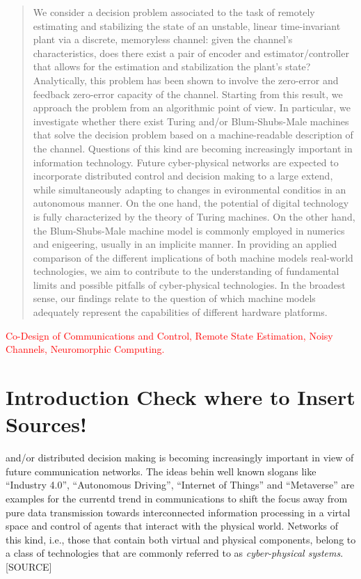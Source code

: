 \documentclass[conference]{IEEEtran}
\newcommand{\sdummy}{{\color{red}[SOURCE]}}
\begin{document}
\begin{abstract}
	We consider a decision problem associated to the task of remotely estimating and stabilizing the state of an unstable, 
	linear time-invariant plant via a discrete, memoryless channel: given the channel's characteristics, does there exist a pair 
	of encoder and estimator/controller that allows for the estimation and stabilization the plant's state? 
	Analytically, this problem has been shown to involve the zero-error and feedback zero-error capacity of the channel. 
	Starting from this result, we approach the problem from an algorithmic point of view. 
	In particular, we investigate whether there exist Turing and/or Blum-Shubs-Male machines that solve the decision problem
	based on a machine-readable description of the channel. Questions of this kind are becoming increasingly important in information technology.
	Future cyber-physical networks are expected to incorporate distributed control and decision making to a large extend,
	while simultaneously adapting to changes in evironmental conditios in an autonomous manner. 
	On the one hand, the potential of digital technology is fully characterized by the theory of Turing machines.
	On the other hand, the Blum-Shubs-Male machine model is commonly employed in numerics and enigeering, usually in an implicite manner. 
	In providing an applied comparison of the different implications of both machine models real-world technologies,
	we aim to contribute to the understanding of fundamental limits and possible pitfalls of cyber-physical technologies.
	In the broadest sense, our findings relate to the question of which machine models adequately represent the capabilities of 
	different hardware platforms. 
\end{abstract}

\begin{IEEEkeywords}
	\textcolor{red}{Co-Design of Communications and Control, Remote State Estimation, Noisy Channels, Neuromorphic Computing.} 
\end{IEEEkeywords}

\section{Introduction {\color{red}\textbf{Check where to Insert Sources!}}}	\label{sec:Introduction}
	 and/or distributed decision making is becoming increasingly important in view of future communication networks. The ideas behin well known slogans like 
	``Industry 4.0'', ``Autonomous Driving'', ``Internet of Things'' and ``Metaverse'' are examples for the currentd trend in communications to shift the focus away from pure data transmission 
	towards interconnected information processing in a virtal space and control of agents that interact with the physical world. Networks of this kind, i.e., those that contain both 
	virtual and physical components, belong to a class of technologies that are commonly referred to as \emph{cyber-physical systems}. \sdummy
	
\end{document}
